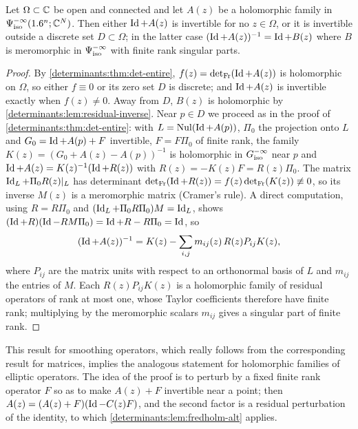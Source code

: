 \begin{lemma}\label{determinants:lem:fredholm-alt}
  Let $\Omega\subset\mathbb{C}$ be open and connected and let $A(z)$ be a holomorphic
  family in $\Psi^{-\infty}_{\mathrm{iso}}(1.6^n;\mathbb{C}^N)$. Then either $\operatorname{Id}+A(z)$ is invertible
  for no $z\in\Omega$, or it is invertible outside a discrete set
  $D\subset\Omega$; in the latter case $(\operatorname{Id}+A(z))^{-1}=\operatorname{Id}+B(z)$ where $B$ is
  meromorphic in $\Psi^{-\infty}_{\mathrm{iso}}$ with finite rank singular parts.
\end{lemma}
\begin{proof}
  By \cref{determinants:thm:det-entire}, $f(z)=\operatorname{det}_{\mathrm{Fr}}(\operatorname{Id}+A(z))$ is
  holomorphic on $\Omega$, so either $f\equiv0$ or its zero set $D$ is
  discrete; and $\operatorname{Id}+A(z)$ is invertible exactly when $f(z)\ne0$. Away from
  $D$, $B(z)$ is holomorphic by \cref{determinants:lem:residual-inverse}.
  Near $p\in D$ we proceed as in the proof of
  \cref{determinants:thm:det-entire}: with $L=\operatorname{Nul}(\operatorname{Id}+A(p))$, $\Pi_0$ the
  projection onto $L$ and $G_0=\operatorname{Id}+A(p)+F$ invertible, $F=F\Pi_0$ of finite
  rank, the family $K(z)=(G_0+A(z)-A(p))^{-1}$ is holomorphic in
  $G^{-\infty}_{\mathrm{iso}}$ near $p$ and $\operatorname{Id}+A(z)=K(z)^{-1}(\operatorname{Id}+R(z))$ with
  $R(z)=-K(z)F=R(z)\Pi_0$. The matrix $\operatorname{Id}_L+\Pi_0R(z)|_L$ has determinant
  $\operatorname{det}_{\mathrm{Fr}}(\operatorname{Id}+R(z))=f(z)\operatorname{det}_{\mathrm{Fr}}(K(z))\not\equiv0$, so its inverse $M(z)$ is a
  meromorphic matrix (Cramer's rule). A direct computation, using
  $R=R\Pi_0$ and $(\operatorname{Id}_L+\Pi_0R\Pi_0)M=\operatorname{Id}_L$, shows
  $(\operatorname{Id}+R)(\operatorname{Id}-RM\Pi_0)=\operatorname{Id}+R-R\Pi_0=\operatorname{Id}$, so
  \begin{equation*}
    (\operatorname{Id}+A(z))^{-1}=K(z)-\sum_{i,j}m_{ij}(z)\,R(z)P_{ij}K(z),
  \end{equation*}
  where $P_{ij}$ are the matrix units with respect to an orthonormal basis of
  $L$ and $m_{ij}$ the entries of $M$. Each $R(z)P_{ij}K(z)$ is a holomorphic
  family of residual operators of rank at most one, whose Taylor coefficients
  therefore have finite rank; multiplying by the meromorphic scalars $m_{ij}$
  gives a singular part of finite rank.
\end{proof}

This result for smoothing operators, which really follows from the
corresponding result for matrices, implies the analogous statement for
holomorphic families of elliptic operators. The idea of the proof is to
perturb by a fixed finite rank operator $F$ so as to make $A(z)+F$
invertible near a point; then $A(z)=(A(z)+F)(\operatorname{Id}-C(z)F)$, and the second
factor is a residual perturbation of the identity, to which
\cref{determinants:lem:fredholm-alt} applies.

